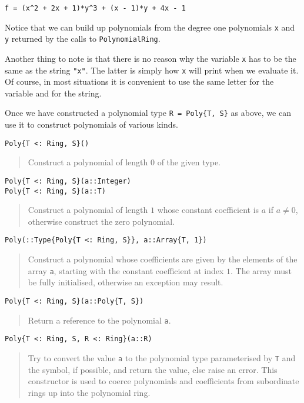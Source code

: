\documentclass[a4paper,10pt]{article}
\newcommand{\code}{\lstinline}
\newcommand{\desc}[1]{\vspace{-3mm}\begin{quote}#1\end{quote}}
\begin{document}
{{{\begin{lstlisting}
f = (x^2 + 2x + 1)*y^3 + (x - 1)*y + 4x - 1
\end{lstlisting}

Notice that we can build up polynomials from the degree one polynomials \code{x} and
\code{y} returned by the calls to \code{PolynomialRing}. 

Another thing to note is that there is no reason why the variable \code{x} has to 
be the same as the string \code{"x"}. The latter is simply how \code{x} will print
when we evaluate it. Of course, in most situations it is convenient to use the same 
letter for the variable and for the string.

Once we have constructed a polynomial type \code|R = Poly{T, S}| as above, we can
use it to construct polynomials of various kinds.

\begin{lstlisting}
Poly{T <: Ring, S}()
\end{lstlisting}

\desc{Construct a polynomial of length $0$ of the given type.}

\begin{lstlisting}
Poly{T <: Ring, S}(a::Integer)
Poly{T <: Ring, S}(a::T)
\end{lstlisting}

\desc{Construct a polynomial of length $1$ whose constant coefficient is $a$ if
$a \neq 0$, otherwise construct the zero polynomial.}

\begin{lstlisting}
Poly(::Type{Poly{T <: Ring, S}}, a::Array{T, 1})
\end{lstlisting}

\desc{Construct a polynomial whose coefficients are given by the elements of the array
\code{a}, starting with the constant coefficient at index $1$. The array must be fully
initialised, otherwise an exception may result.}

\begin{lstlisting}
Poly{T <: Ring, S}(a::Poly{T, S})
\end{lstlisting}

\desc{Return a reference to the polynomial \code{a}.}

\begin{lstlisting}
Poly{T <: Ring, S, R <: Ring}(a::R)
\end{lstlisting}

\desc{Try to convert the value \code{a} to the polynomial type parameterised by 
\code{T} and the symbol, if possible, and return the value, else raise an error. 
This constructor is used to coerce polynomials and coefficients from subordinate rings up
into the polynomial ring.}

}}}
\end{document}
